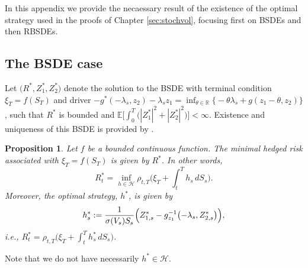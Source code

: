 \documentclass{article}
\newcommand{\R}{\mathbb{R}}
\newcommand{\E}{\mathbb{E}}
\newtheorem{proposition}[definition]{Proposition}
\begin{document}
In this appendix we provide the necaessary result of the existence of the optimal strategy used in the proofs of Chapter \ref{sec:stochvol}, focusing first on BSDEs and then RBSDEs.

\subsection{The BSDE case}

Let $\bigl(R^*, Z_1^*, Z_2^*\bigr)$ denote the solution to the BSDE with terminal condition $\xi_T=f(S_T)$ and driver $- g^*(-\lambda_s, z_2)-\lambda_s z_1 = \inf_{\theta\in \R}\bigl\{-\theta\lambda_s+g( z_1-\theta, z_2)\bigr\}$, such that $R^*$ is bounded and $\E\bigl[\int_0^T \bigl(|Z_1^*|^2 +|Z_2^*|^2\bigr)\bigr]<\infty$.  Existence and uniqueness of this BSDE is provided by \cite{Kob00}.

\begin{proposition}\label{prop:optstrat}
	Let $f$ be a bounded continuous function. The minimal hedged risk associated with $\xi_T=f(S_T)$ is given by $R^*$. In other words, 
	\[
		R^*_t= \inf_{h\in \mathcal H} \rho_{t, T}\bigl(\xi_T + \int_t^T h_s \, dS_s\bigr).
	\]
	Moreover, the optimal strategy, $h^*$, is given by
	\begin{equation}\label{inf-strategy}
		h^*_s:= \frac{1}{\sigma(V_s)S_s}\Bigl(Z^*_{1,s} - g_{z_1}^{-1}\bigl(-\lambda_s, Z^*_{2,s}\bigr)\Bigr),
	\end{equation}
	i.e., $R_t^*= \rho_{t, T}\bigl(\xi_T + \int_t^T h^*_s \, dS_s\bigr)$. 
\end{proposition}

Note that we do not have necessarily $h^* \in \mathcal H$.
\end{document}
